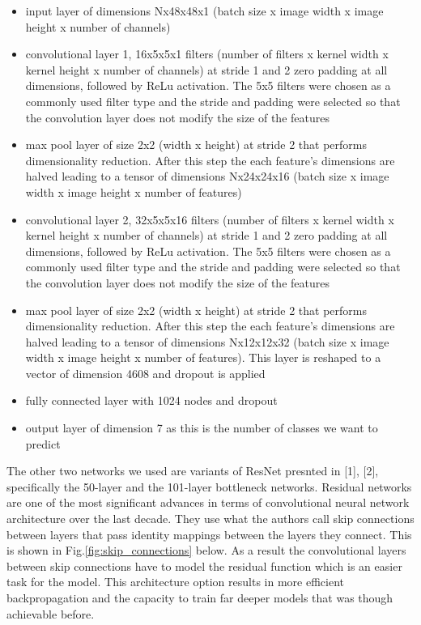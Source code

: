 \documentclass[12pt,twoside]{article}
\begin{document}
\begin{itemize}
\item input layer of dimensions Nx48x48x1 (batch size x image width x image height x number of channels)
\item convolutional layer 1, 16x5x5x1 filters (number of filters x kernel width x kernel height x number of channels) at stride 1 and 2 zero padding at all dimensions, followed by ReLu activation. The 5x5 filters were chosen as a commonly used filter type and the stride and padding were selected so that the convolution layer does not modify the size of the features
\item max pool layer of size 2x2 (width x height) at stride 2 that performs dimensionality reduction. After this step the each feature's dimensions are halved leading to a tensor of dimensions Nx24x24x16 (batch size x image width x image height x number of features)
\item convolutional layer 2, 32x5x5x16 filters (number of filters x kernel width x kernel height x number of channels) at stride 1 and 2 zero padding at all dimensions, followed by ReLu activation. The 5x5 filters were chosen as a commonly used filter type and the stride and padding were selected so that the convolution layer does not modify the size of the features
\item max pool layer of size 2x2 (width x height) at stride 2 that performs dimensionality reduction. After this step the each feature's dimensions are halved leading to a tensor of dimensions Nx12x12x32 (batch size x image width x image height x number of features). This  layer is reshaped to a vector of dimension 4608 and dropout is applied
\item fully connected layer with 1024 nodes and dropout
\item output layer of dimension 7 as this is the number of classes we want to predict
\end{itemize}

The other two networks we used are variants of ResNet presnted in [1], [2], specifically the 50-layer and the 101-layer bottleneck networks. Residual networks are one of the most significant advances in terms of convolutional neural network architecture over the last decade. They use what the authors call skip connections between layers that pass identity mappings between the layers they connect. This is shown in Fig.\ref{fig:skip_connections} below. As a result the convolutional layers between skip connections have to model the residual function which is an easier task for the model. This architecture option results in more efficient backpropagation and the capacity to train far deeper models that was though achievable before.   
\end{document}
